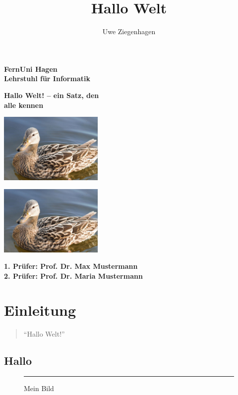 \documentclass[12pt,ngerman,bibtotoc]{scrreprt}
\author{Uwe Ziegenhagen}
\title{Hallo Welt}
\def\bild{\rule{14cm}{10cm}}
\begin{document}
\begin{titlepage}
{\huge \textbf{FernUni Hagen \\
Lehrstuhl für Informatik}}\vspace{4cm}

\begin{center}
{\Huge \textbf{Hallo Welt! -- ein Satz, den \\ alle kennen}}
\end{center}\vspace{4cm}

\hspace{2cm}\includegraphics[width=5cm]{Bilder/image1}

\hfill\includegraphics[width=5cm]{Bilder/image1}


\vfill
{\Large\textbf{1. Prüfer: Prof. Dr. Max Mustermann \\
2. Prüfer: Prof. Dr. Maria Mustermann}}
\end{titlepage}

\tableofcontents

\listoffigures

\chapter{Einleitung}\label{cha:einleitung}

\begin{quote}
\enquote{Hallo Welt!}
\end{quote}

\section{Hallo}

\blindtext[1]

\begin{figure}[h]
\begin{center}
\bild
\caption{Mein Bild}
\end{center}
\end{figure}
\end{document}
